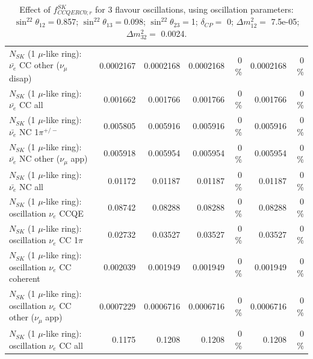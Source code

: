 \begin{table}
\begin{tabular}{| l | r | r | r  r | r  r |}
          $N_{SK}$ (1 $\mu$-like ring): $\bar{\nu_e}$ CC other ($\nu_\mu$ disap) &       0.0002167 &       0.0002168 &       0.0002168 &        0 \%  &       0.0002168 &        0 \%  \\ 
                            $N_{SK}$ (1 $\mu$-like ring): $\bar{\nu_{e}}$ CC all &        0.001662 &        0.001766 &        0.001766 &        0 \%  &        0.001766 &        0 \%  \\ 
\hline
                     $N_{SK}$ (1 $\mu$-like ring): $\bar{\nu_e}$ NC 1$\pi^{+/-}$ &        0.005805 &        0.005916 &        0.005916 &        0 \%  &        0.005916 &        0 \%  \\ 
            $N_{SK}$ (1 $\mu$-like ring): $\bar{\nu_e}$ NC other ($\nu_\mu$ app) &        0.005918 &        0.005954 &        0.005954 &        0 \%  &        0.005954 &        0 \%  \\ 
                            $N_{SK}$ (1 $\mu$-like ring): $\bar{\nu_{e}}$ NC all &         0.01172 &         0.01187 &         0.01187 &        0 \%  &         0.01187 &        0 \%  \\ 
\hline
\hline
\hline
                          $N_{SK}$ (1 $\mu$-like ring): oscillation $\nu_e$ CCQE &         0.08742 &         0.08288 &         0.08288 &        0 \%  &         0.08288 &        0 \%  \\ 
                     $N_{SK}$ (1 $\mu$-like ring): oscillation $\nu_e$ CC 1$\pi$ &         0.02732 &         0.03527 &         0.03527 &        0 \%  &         0.03527 &        0 \%  \\ 
                   $N_{SK}$ (1 $\mu$-like ring): oscillation $\nu_e$ CC coherent &        0.002039 &        0.001949 &        0.001949 &        0 \%  &        0.001949 &        0 \%  \\ 
      $N_{SK}$ (1 $\mu$-like ring): oscillation $\nu_e$ CC other ($\nu_\mu$ app) &       0.0007229 &       0.0006716 &       0.0006716 &        0 \%  &       0.0006716 &        0 \%  \\ 
                       $N_{SK}$ (1 $\mu$-like ring): oscillation $\nu_e$  CC all &          0.1175 &          0.1208 &          0.1208 &        0 \%  &          0.1208 &        0 \%  \\ 
\hline
\hline
\end{tabular}
\caption{ Effect of $f_{CCQERC0; r}^{SK}$ for 3 flavour oscillations, using oscillation parameters:  $\sin^22\theta_{12} = $0.857; $\sin^22\theta_{13} = $0.098; $\sin^22\theta_{23} = $1; $\delta_{CP} = $        0; $\Delta m^2_{12} = $    7.5e-05; $\Delta m^2_{32} = $    0.0024. }
\label{tab:num_sk_1Rmu_ccqe_ring_counting_eff_0_1RmuT_3f_osc_t13:0.098_spectralreco_spectraltrue}
\end{table}
